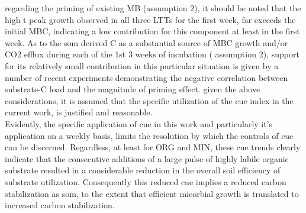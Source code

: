 	regarding the priming of existing MB (assumption 2), it should be noted that the high t peak growth observed in all three LTTs for the first week, far exceeds the initial MBC, indicating a low contribution for this component at least in the first week.
	As to the \gls{som} derived C as a substantial source of MBC growth and/or CO2 efflux during each of the 1st 3 weeks of incubation ( assumption 2),  support for its relatively small contribution in this particular situation is given by a number of recent experiments demonstrating the negative correlation between substrate-C load and the magnitude of priming effect\citep{blagodatskaya2011, schneckenberger2008, wu1993}.
	given the above considerations, it is assumed that the specific utilization of the \gls{cue} index in the current work, is justified and reasonable.\\
	Evidently, the specific application of \gls{cue} in this work and particularly it's application on a weekly basis, limits the resolution by which the controls of \gls{cue} can be discerned. Regardless, at least for ORG and MIN, these \gls{cue} trends clearly indicate that the consecutive additions of a large pulse of highly labile organic substrate resulted in a considerable reduction in the overall soil efficiency of substrate utilization. Consequently this reduced \gls{cue} implies a reduced carbon stabilization as \gls{som}, to the extent that efficient micorbial growth is translated to increased carbon stabilization.

	\vspace{\textheight }
